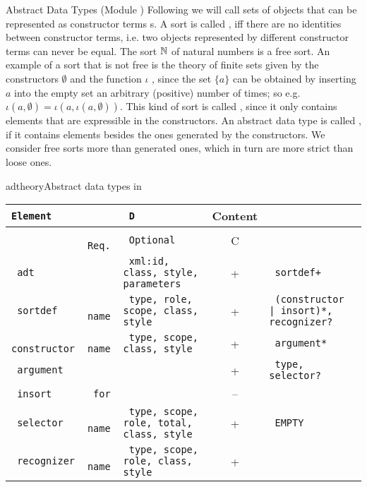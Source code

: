 \begin{tchapter}[id=adt,short=Abstract Data Types]{Abstract Data Types (Module {})}
  Following {\casl} we will call sets of objects that can be represented as constructor
  terms {s}. A sort is called {}, iff there are no identities
  between constructor terms, i.e.  two objects represented by different constructor terms
  can never be equal. The sort ${\mathbb{N}}$ of natural numbers is a free sort. An example of a
  sort that is not free is the theory of finite sets given by the constructors $\emptyset$
  and the {} function $\iota$ , since the set $\{a\}$ can be
  obtained by inserting $a$ into the empty set an arbitrary (positive) number of times; so
  e.g. $\iota(a,\emptyset)=\iota(a,\iota(a,\emptyset))$. This kind of sort is called
  {}, since it only contains elements that are expressible in the
  constructors. An abstract data type is called {}, if it contains elements
  besides the ones generated by the constructors. We consider free sorts more
  {} than generated ones, which in turn are more strict than loose ones.
\begin{myfig}{adtheory}{Abstract data types in {\omdoc}}
\scriptsize
\begin{tabular}{|>{\tt}l|>{\tt}l|>{\tt}p{}|c|>{\tt}p{}|}\hline
{\rm Element}& \multicolumn{2}{l|}{Attributes\hspace*{2.25cm}} & D & Content  \\\hline
             & {\rm Req.}  & {\rm Optional}     & C &           \\\hline\hline
 adt         &          & xml:id, class, style, parameters  & +  & sortdef+\\\hline
 sortdef     & name     & type, role, scope, class, style & + & (constructor | insort)*, recognizer? \\\hline
 constructor & name     & type, scope, class, style & +  & argument*\\\hline
 argument    &          &              & +  & type, selector?\\\hline
 insort      & for      &              & -- & \\\hline
 selector    & name     & type, scope, role, total, class, style
                                       & + & EMPTY\\\hline
 recognizer  & name     & type, scope, role, class, style & + & \\\hline
\end{tabular}
\end{myfig}


\end{tchapter}
